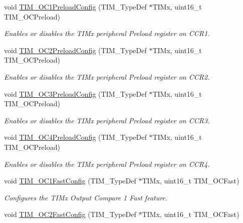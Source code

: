 \begin{DoxyCompactItemize}
void \hyperlink{group___t_i_m___group2_ga60e6c29ad8f919bef616cf8e3306dd64}{T\-I\-M\-\_\-\-O\-C1\-Preload\-Config} (T\-I\-M\-\_\-\-Type\-Def $\ast$T\-I\-Mx, uint16\-\_\-t T\-I\-M\-\_\-\-O\-C\-Preload)
\begin{DoxyCompactList}\small\item\em Enables or disables the T\-I\-Mx peripheral Preload register on C\-C\-R1. \end{DoxyCompactList}\item 
void \hyperlink{group___t_i_m___group2_ga75b4614c6dd2cd52f2c5becdb6590c10}{T\-I\-M\-\_\-\-O\-C2\-Preload\-Config} (T\-I\-M\-\_\-\-Type\-Def $\ast$T\-I\-Mx, uint16\-\_\-t T\-I\-M\-\_\-\-O\-C\-Preload)
\begin{DoxyCompactList}\small\item\em Enables or disables the T\-I\-Mx peripheral Preload register on C\-C\-R2. \end{DoxyCompactList}\item 
void \hyperlink{group___t_i_m___group2_ga8b2391685a519e60e596b7d596f86f09}{T\-I\-M\-\_\-\-O\-C3\-Preload\-Config} (T\-I\-M\-\_\-\-Type\-Def $\ast$T\-I\-Mx, uint16\-\_\-t T\-I\-M\-\_\-\-O\-C\-Preload)
\begin{DoxyCompactList}\small\item\em Enables or disables the T\-I\-Mx peripheral Preload register on C\-C\-R3. \end{DoxyCompactList}\item 
void \hyperlink{group___t_i_m___group2_ga8bf4dfb35ff0c7b494dd96579f50b1ec}{T\-I\-M\-\_\-\-O\-C4\-Preload\-Config} (T\-I\-M\-\_\-\-Type\-Def $\ast$T\-I\-Mx, uint16\-\_\-t T\-I\-M\-\_\-\-O\-C\-Preload)
\begin{DoxyCompactList}\small\item\em Enables or disables the T\-I\-Mx peripheral Preload register on C\-C\-R4. \end{DoxyCompactList}\item 
void \hyperlink{group___t_i_m___group2_gaec82031ca62f31f5483195c09752a83a}{T\-I\-M\-\_\-\-O\-C1\-Fast\-Config} (T\-I\-M\-\_\-\-Type\-Def $\ast$T\-I\-Mx, uint16\-\_\-t T\-I\-M\-\_\-\-O\-C\-Fast)
\begin{DoxyCompactList}\small\item\em Configures the T\-I\-Mx Output Compare 1 Fast feature. \end{DoxyCompactList}\item 
void \hyperlink{group___t_i_m___group2_ga413359c87f46c69f1ffe2dc8fb3a65e7}{T\-I\-M\-\_\-\-O\-C2\-Fast\-Config} (T\-I\-M\-\_\-\-Type\-Def $\ast$T\-I\-Mx, uint16\-\_\-t T\-I\-M\-\_\-\-O\-C\-Fast)

\end{DoxyCompactItemize}

